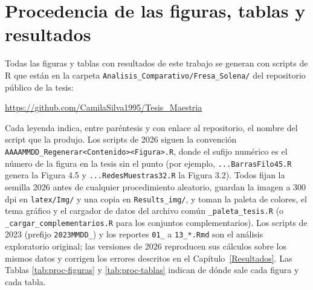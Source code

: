\chapter[Procedencia de figuras y tablas]{Procedencia de las figuras, tablas y resultados}
\label{ap:procedencia}

Todas las figuras y tablas con resultados de este trabajo se generan con scripts de R que están en
la carpeta \texttt{Analisis\_Comparativo/\allowbreak Fresa\_Solena/} del repositorio público de la tesis:
\begin{center}
\url{https://github.com/CamilaSilva1995/Tesis_Maestria}
\end{center} Cada leyenda indica, entre paréntesis y con enlace al repositorio, el nombre del script
que la produjo. Los scripts de 2026 siguen la convención
\texttt{AAAAMMDD\_Regenerar<Contenido><Figura>.R}, donde el sufijo numérico es el número de la
figura en la tesis sin el punto (por ejemplo, \texttt{...BarrasFilo45.R} genera la Figura 4.5 y
\texttt{...RedesMuestras32.R} la Figura 3.2). Todos fijan la semilla 2026 antes de cualquier
procedimiento aleatorio, guardan la imagen a 300 dpi en \texttt{latex/Img/} y una copia en
\texttt{Results\_img/}, y toman la paleta de colores, el tema gráfico y el cargador de datos del
archivo común \texttt{\_paleta\_tesis.R} (o \texttt{\_cargar\_complementarios.R} para los conjuntos
complementarios). Los scripts de 2023 (prefijo \texttt{2023MMDD\_}) y los reportes
\texttt{01\_} a \texttt{13\_*.Rmd} son el análisis exploratorio original; las versiones de 2026
reproducen sus cálculos sobre los mismos datos y corrigen los errores descritos en el
Capítulo~\ref{Resultados}. Las Tablas \ref{tab:proc-figuras} y \ref{tab:proc-tablas} indican de
dónde sale cada figura y cada tabla.

